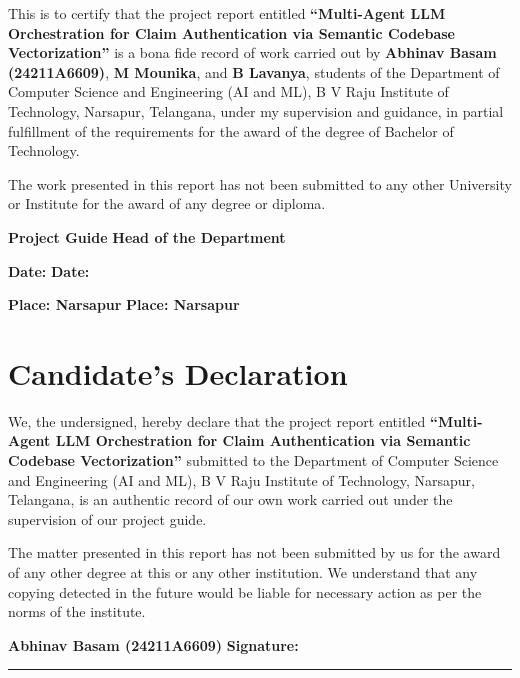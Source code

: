 \documentclass[12pt,a4paper]{report}
\begin{document}
This is to certify that the project report entitled \textbf{``Multi-Agent LLM Orchestration for Claim Authentication via Semantic Codebase Vectorization''} is a bona fide record of work carried out by \textbf{Abhinav Basam (24211A6609)}, \textbf{M Mounika}, and \textbf{B Lavanya}, students of the Department of Computer Science and Engineering (AI and ML), B V Raju Institute of Technology, Narsapur, Telangana, under my supervision and guidance, in partial fulfillment of the requirements for the award of the degree of Bachelor of Technology.

The work presented in this report has not been submitted to any other University or Institute for the award of any degree or diploma.

\vspace{2in}

\noindent \textbf{Project Guide} \hfill \textbf{Head of the Department}

\vspace{0.5in}

\noindent \textbf{Date:} \hfill \textbf{Date:}

\noindent \textbf{Place: Narsapur} \hfill \textbf{Place: Narsapur}


\chapter*{Candidate's Declaration}

We, the undersigned, hereby declare that the project report entitled \textbf{``Multi-Agent LLM Orchestration for Claim Authentication via Semantic Codebase Vectorization''} submitted to the Department of Computer Science and Engineering (AI and ML), B V Raju Institute of Technology, Narsapur, Telangana, is an authentic record of our own work carried out under the supervision of our project guide.

The matter presented in this report has not been submitted by us for the award of any other degree at this or any other institution. We understand that any copying detected in the future would be liable for necessary action as per the norms of the institute.

\vspace{1.2in}

\noindent \textbf{Abhinav Basam (24211A6609)} \hfill \textbf{Signature:} \rule{2in}{0.4pt}

\vspace{0.3in}
\end{document}
